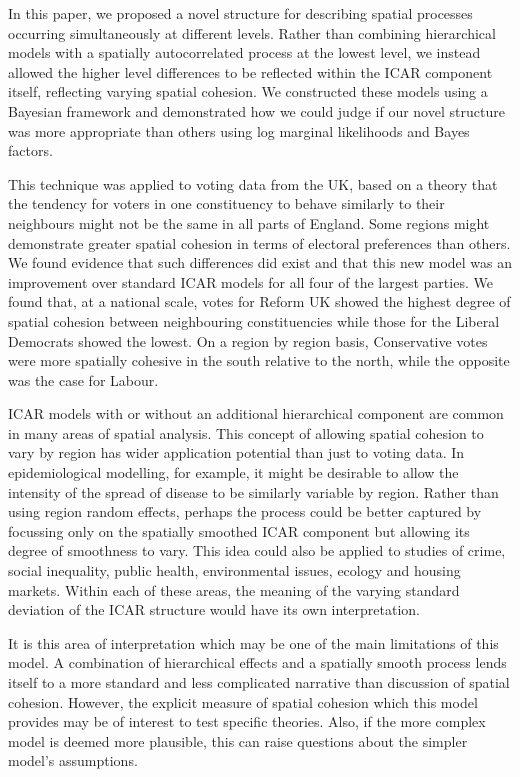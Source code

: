 \documentclass[webpdf,large,contemporary,namedate]{oup-authoring-template}
\theoremstyle{thmstyleone}
\theoremstyle{thmstyletwo}
\theoremstyle{thmstylethree}
\begin{document}
In this paper, we proposed a novel structure for describing spatial
processes occurring simultaneously at different levels. Rather than
combining hierarchical models with a spatially autocorrelated process at
the lowest level, we instead allowed the higher level differences to be
reflected within the ICAR component itself, reflecting varying spatial
cohesion. We constructed these models using a Bayesian framework and
demonstrated how we could judge if our novel structure was more
appropriate than others using log marginal likelihoods and Bayes
factors.

This technique was applied to voting data from the UK, based on a theory
that the tendency for voters in one constituency to behave similarly to
their neighbours might not be the same in all parts of England. Some
regions might demonstrate greater spatial cohesion in terms of electoral
preferences than others. We found evidence that such differences did
exist and that this new model was an improvement over standard ICAR
models for all four of the largest parties. We found that, at a national
scale, votes for Reform UK showed the highest degree of spatial cohesion
between neighbouring constituencies while those for the Liberal
Democrats showed the lowest. On a region by region basis, Conservative
votes were more spatially cohesive in the south relative to the north,
while the opposite was the case for Labour.

ICAR models with or without an additional hierarchical component are
common in many areas of spatial analysis. This concept of allowing
spatial cohesion to vary by region has wider application potential than
just to voting data. In epidemiological modelling, for example, it might
be desirable to allow the intensity of the spread of disease to be
similarly variable by region. Rather than using region random effects,
perhaps the process could be better captured by focussing only on the
spatially smoothed ICAR component but allowing its degree of smoothness
to vary. This idea could also be applied to studies of crime, social
inequality, public health, environmental issues, ecology and housing
markets. Within each of these areas, the meaning of the varying standard
deviation of the ICAR structure would have its own interpretation.

It is this area of interpretation which may be one of the main
limitations of this model. A combination of hierarchical effects and a
spatially smooth process lends itself to a more standard and less
complicated narrative than discussion of spatial cohesion. However, the
explicit measure of spatial cohesion which this model provides may be of
interest to test specific theories. Also, if the more complex model is
deemed more plausible, this can raise questions about the simpler
model's assumptions.
\end{document}
